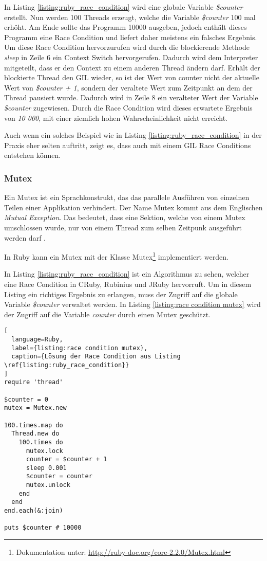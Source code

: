 In Listing \ref{listing:ruby_race_condition} wird eine globale Variable \emph{\$counter} erstellt. Nun werden 100 Threads erzeugt, welche die Variable \emph{\$counter} 100 mal erhöht. Am Ende sollte das Programm 10000 ausgeben, jedoch enthält dieses Programm eine Race Condition und liefert daher meistens ein falsches Ergebnis. Um diese Race Condition hervorzurufen wird durch die blockierende Methode \emph{sleep} in Zeile 6 ein Context Switch hervorgerufen. Dadurch wird dem Interpreter mitgeteilt, dass er den Context zu einem anderen Thread ändern darf. Erhält der blockierte Thread den GIL wieder, so ist der Wert von counter nicht der aktuelle Wert von  \emph{\$counter + 1}, sondern der veraltete Wert zum Zeitpunkt an dem der Thread pausiert wurde. Dadurch wird in Zeile 8 ein veralteter Wert der Variable \emph{\$counter} zugewiesen. Durch die Race Condition wird dieses erwartete Ergebnis von \emph{10 000}, mit einer ziemlich hohen Wahrscheinlichkeit nicht erreicht.

Auch wenn ein solches Beispiel wie in Listing \ref{listing:ruby_race_condition} in der Praxis eher selten auftritt, zeigt es, dass auch mit einem GIL Race Conditions entstehen können.

\subsubsection{Mutex}
Ein Mutex ist ein Sprachkonstrukt, das das parallele Ausführen von einzelnen Teilen einer Applikation verhindert. Der Name Mutex kommt aus dem Englischen \emph{Mutual Exception}. Das bedeutet, dass eine Sektion, welche von einem Mutex umschlossen wurde, nur von einem Thread zum selben Zeitpunk ausgeführt werden darf \cite[p. 81]{Sto2013}. 

In Ruby kann ein Mutex mit der Klasse Mutex\footnote{Dokumentation unter:  \url{http://ruby-doc.org/core-2.2.0/Mutex.html}} implementiert werden.

In Listing \ref{listing:ruby_race_condition} ist ein Algorithmus zu sehen, welcher eine Race Condition in CRuby, Rubinius und JRuby hervorruft. Um in diesem Listing ein richtiges Ergebnis zu erlangen, muss der Zugriff auf die globale Variable \emph{\$counter} verwaltet werden. In Listing \ref{listing:race condition mutex} wird der Zugriff auf die Variable \emph{counter} durch einen Mutex geschützt. 

\begin{lstlisting}[
  language=Ruby,
  label={listing:race condition mutex},
  caption={Lösung der Race Condition aus Listing \ref{listing:ruby_race_condition}}
]
require 'thread'

$counter = 0
mutex = Mutex.new

100.times.map do
  Thread.new do
    100.times do
      mutex.lock
      counter = $counter + 1
      sleep 0.001
      $counter = counter
      mutex.unlock
    end
  end
end.each(&:join)

puts $counter # 10000
\end{lstlisting}

